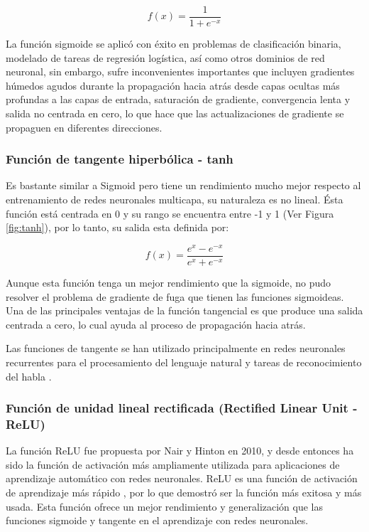 \begin{equation}
f(x) = \frac{1}{1+e^{-x}}
\end{equation}

La funci\'{o}n sigmoide se aplic\'{o} con éxito en problemas de clasificación binaria, modelado de tareas de regresión logística, así como otros dominios de red neuronal, sin embargo, sufre inconvenientes importantes que incluyen gradientes húmedos agudos durante la propagación hacia atrás desde capas ocultas más profundas a las capas de entrada, saturación de gradiente, convergencia lenta y salida no centrada en cero, lo que hace que las actualizaciones de gradiente se propaguen en diferentes direcciones.

\subsubsection{Funci\'{o}n de tangente hiperb\'{o}lica - tanh}

Es bastante similar a Sigmoid pero tiene un rendimiento mucho mejor respecto al entrenamiento de redes neuronales multicapa, su naturaleza es no lineal. \'{E}sta funci\'{o}n est\'{a} centrada en 0 y su rango se encuentra entre -1 y 1 (Ver Figura \ref{fig:tanh}), por lo tanto, su salida esta definida por:

\begin{equation}
f(x)=\frac{e^{x}-e^{-x}}{e^{x}+e^{-x}}
\end{equation}
    
Aunque esta funci\'{o}n tenga un mejor rendimiento que la sigmoide, no pudo resolver el problema de gradiente de fuga que tienen las funciones sigmoideas. Una de las principales ventajas de la funci\'{o}n tangencial es que produce una salida centrada a cero, lo cual ayuda al proceso de propagaci\'{o}n hacia atr\'{a}s.

\vspace{5mm} %

Las funciones de tangente se han utilizado principalmente en redes neuronales recurrentes para el procesamiento del lenguaje natural \cite{43} y tareas de reconocimiento del habla \cite{44}.
    
\subsubsection{Funci\'{o}n de unidad lineal rectificada (Rectified Linear Unit - ReLU)}

La funci\'{o}n ReLU fue propuesta por Nair y Hinton en 2010, y desde entonces ha sido la funci\'{o}n de activaci\'{o}n m\'{a}s ampliamente utilizada para aplicaciones de aprendizaje autom\'{a}tico con redes neuronales. ReLU es una funci\'{o}n de activaci\'{o}n de aprendizaje m\'{a}s r\'{a}pido \cite{46}, por lo que demostr\'{o} ser la funci\'{o}n m\'{a}s exitosa y m\'{a}s usada. Esta funci\'{o}n ofrece un mejor rendimiento y generalizaci\'{o}n que las funciones sigmoide y tangente en el aprendizaje con redes neuronales.

